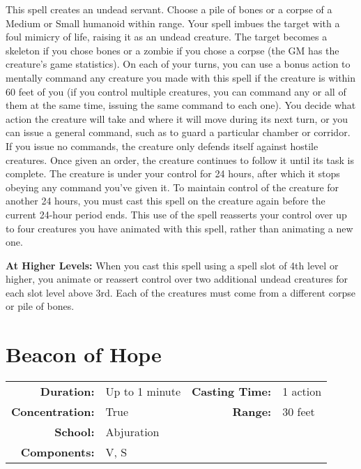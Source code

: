 \documentclass[a5paper, 12pt]{memoir}
\begin{document}
\vspace{1\baselineskip}\noindent This spell creates an undead servant. Choose a pile of bones or a corpse of a Medium or Small humanoid within range. Your spell imbues the target with a foul mimicry of life, raising it as an undead creature. The target becomes a skeleton if you chose bones or a zombie if you chose a corpse (the GM has the creature's game statistics). On each of your turns, you can use a bonus action to mentally command any creature you made with this spell if the creature is within 60 feet of you (if you control multiple creatures, you can command any or all of them at the same time, issuing the same command to each one). You decide what action the creature will take and where it will move during its next turn, or you can issue a general command, such as to guard a particular chamber or corridor. If you issue no commands, the creature only defends itself against hostile creatures. Once given an order, the creature continues to follow it until its task is complete. The creature is under your control for 24 hours, after which it stops obeying any command you've given it. To maintain control of the creature for another 24 hours, you must cast this spell on the creature again before the current 24-hour period ends. This use of the spell reasserts your control over up to four creatures you have animated with this spell, rather than animating a new one.

\vspace{8pt} \noindent\textbf{At Higher Levels:} When you cast this spell using a spell slot of 4th level or higher, you animate or reassert control over two additional undead creatures for each slot level above 3rd. Each of the creatures must come from a different corpse or pile of bones.
\newpage
\section*{Beacon of Hope}

{
\small\centering\vspace{-6pt}
\begin{tabular}{rlrl}
\toprule

\textbf{Duration:} & Up to 1 minute &
\textbf{Casting Time:} & 1 action \\
\textbf{Concentration:} & True &
\textbf{Range:} & 30 feet \\
\textbf{School:} & Abjuration \\
\textbf{Components:} & \multicolumn{3}{p{0.7\textwidth}}{V, S}\\

\bottomrule
\end{tabular}
}
\end{document}
